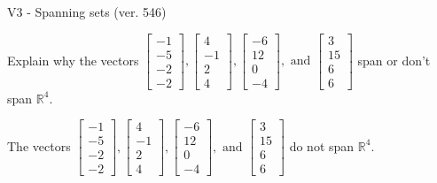 \begin{exercise}
  \begin{exerciseTitle}V3 - Spanning sets (ver. 546)\end{exerciseTitle}
  \begin{exerciseStatement}
    Explain why the vectors \(\left[\begin{array}{r}
-1 \\
-5 \\
-2 \\
-2
\end{array}\right] , \left[\begin{array}{r}
4 \\
-1 \\
2 \\
4
\end{array}\right] , \left[\begin{array}{r}
-6 \\
12 \\
0 \\
-4
\end{array}\right] , \text{ and } \left[\begin{array}{r}
3 \\
15 \\
6 \\
6
\end{array}\right]\) span or don't span \(\mathbb{R}^4\). 
	


  \end{exerciseStatement}
  \begin{exerciseAnswer}
   The vectors \(\left[\begin{array}{r}
-1 \\
-5 \\
-2 \\
-2
\end{array}\right] , \left[\begin{array}{r}
4 \\
-1 \\
2 \\
4
\end{array}\right] , \left[\begin{array}{r}
-6 \\
12 \\
0 \\
-4
\end{array}\right] , \text{ and } \left[\begin{array}{r}
3 \\
15 \\
6 \\
6
\end{array}\right]\) 
  	 do not  
	span \(\mathbb{R}^4\).
  


  \end{exerciseAnswer}
\end{exercise}